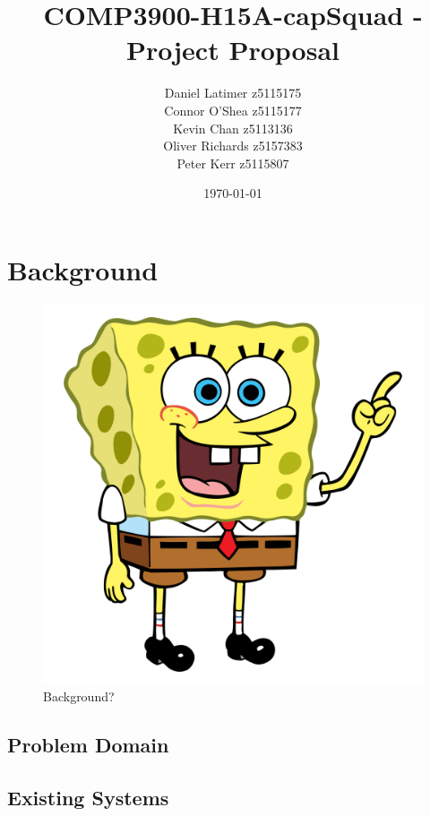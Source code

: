 \documentclass[12pt]{article}
\title{COMP3900-H15A-capSquad - Project Proposal}
\date{\today}
\author{Daniel Latimer z5115175 \\ Connor O'Shea z5115177 \\ Kevin Chan z5113136 \\ Oliver Richards z5157383 \\ Peter Kerr z5115807}
\begin{document}
\maketitle
\tableofcontents
\newpage

\section{Background}

\begin{figure} 
    \includegraphics[width=\textwidth]{resources/spongebob}
    \caption{Background? \cite{Laird2012}}
    \label{fig:background}
\end{figure} 

\subsection{Problem Domain}
\subsection{Existing Systems}

\end{document}
